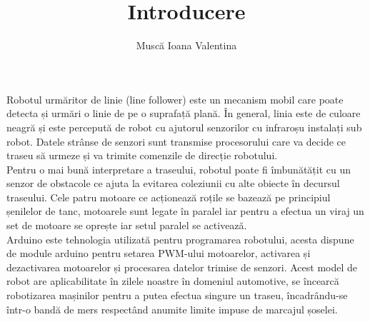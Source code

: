 \documentclass[a4paper]{article}
\title{Introducere}
\author{Muscă Ioana Valentina}
\date{}
\begin{document}
\maketitle


\begin{normalsize}

\hspace{5mm}Robotul urmăritor de linie (line follower) este un mecanism mobil care poate detecta și urmări o linie de pe o suprafață plană. În general, linia este de culoare neagră și este percepută de robot cu ajutorul senzorilor cu infraroșu instalați sub robot. Datele strânse de senzori sunt transmise procesorului care va decide ce traseu să urmeze și va trimite comenzile de direcție robotului.\\

\hspace{5mm}Pentru o mai bună interpretare a traseului, robotul poate fi îmbunătățit cu un senzor de obstacole ce ajuta la evitarea coleziunii cu alte obiecte în decursul traseului. Cele patru motoare ce acționează roțile se bazează pe principiul șenilelor de tanc, motoarele sunt legate în paralel iar pentru a efectua un viraj un set de motoare se oprește iar setul paralel se activează.\\

\hspace{5mm}Arduino este tehnologia utilizată pentru programarea robotului, acesta dispune de module arduino pentru setarea PWM-ului motoarelor, activarea și dezactivarea motoarelor și procesarea datelor trimise de senzori. Acest model de robot are aplicabilitate în zilele noastre în domeniul automotive, se încearcă robotizarea mașinilor pentru a putea efectua singure un traseu, încadrându-se într-o bandă de mers respectând anumite limite impuse de marcajul șoselei.\\

\end{normalsize}
\end{document}
